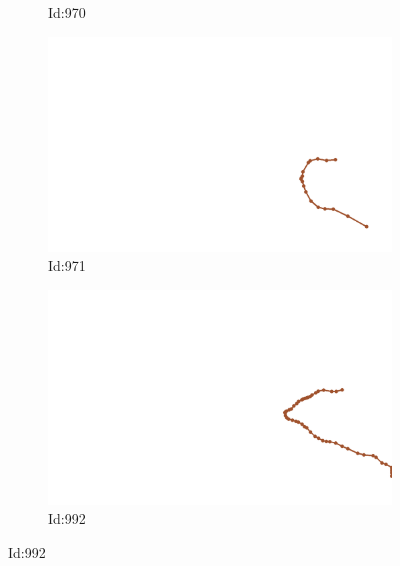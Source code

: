 \documentclass[12pt,twoside]{report}
\begin{document}
\begin{figure}
\begin{subfigure}[b]{0.20\textwidth}
\caption{Id:970}
\end{subfigure}
\begin{subfigure}[b]{0.20\textwidth}
\centering
\includegraphics[width=\textwidth]{../trajectories/971.png}
\caption{Id:971}
\end{subfigure}
\begin{subfigure}[b]{0.20\textwidth}
\centering
\includegraphics[width=\textwidth]{../trajectories/992.png}
\caption{Id:992}
\end{subfigure}
\end{figure}
\end{document}
